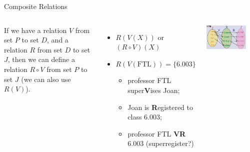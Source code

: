 \begin{frame}[t]{Composite Relations}

  \begin{columns}[t]

    If we have a relation $V$ from set $P$ to set $D$, and a relation $R$ from set $D$ to set $J$, then we can define a  relation $R\circ V$ from set $P$ to set $J$ (we can also use $R(V)$).\bigskip

    \begin{itemize}
    \item $R(V(X))$ or $(R\circ V)(X)$
    \item $R(V(\text{FTL})) = \{6.003\}$
    \begin{itemize}
      \item professor FTL super{\bf V}ises Joan;\bigskip

      \item Joan is {\bf R}egistered to class 6.003;\bigskip

      \item professor FTL {\bf VR} 6.003 (superregister?)
    \end{itemize}
    \end{itemize}


    \begin{center}
      \includegraphics[width=0.8\textwidth]{../img/composite_relation}
    \end{center}

  \end{columns}
\end{frame}


